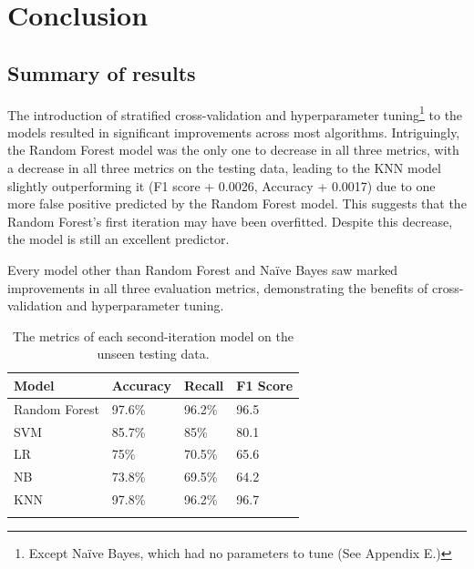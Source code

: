 \documentclass[12pt]{report}
\newcommand{\para}{\vspace{8pt}\noindent}
\begin{document}
\chapter{Conclusion}
\section{Summary of results} 

The introduction of stratified cross-validation and hyperparameter tuning\footnote{Except Na\"ive Bayes, which had no parameters to tune (See Appendix E.)} to the models
resulted in significant improvements across most algorithms. Intriguingly, the Random Forest model was the only one to decrease in all three metrics, with a decrease in 
all three metrics on the testing data, leading to the KNN model slightly outperforming it (F1 score + 0.0026, Accuracy + 0.0017)
due to one more false positive predicted by the Random Forest model. This suggests that the Random Forest's first iteration may have been overfitted. Despite 
this decrease, the model is still an excellent predictor.

\para Every model other than Random Forest and Na\"ive Bayes saw marked improvements in all three evaluation metrics, demonstrating the benefits of cross-validation 
and hyperparameter tuning.

\begin{longtable}{ | p{} | p{} | p{} | p{} | }
    \hline
    \cellcolor{blue!25} Model & \cellcolor{blue!25} Accuracy & \cellcolor{blue!25} Recall & \cellcolor{blue!25} F1 Score\\
    \hline
    Random Forest & 97.6\% & 96.2\% & 96.5\\
    \hline
    SVM & 85.7\% & 85\% & 80.1 \\
    \hline
    LR & 75\% & 70.5\% & 65.6\\
    \hline
    NB & 73.8\% & 69.5\% & 64.2\\
    \hline
    KNN & 97.8\% & 96.2\% & 96.7 \\
    \hline
    \caption{The metrics of each second-iteration model on the unseen testing data.}\label{tab:Iteration2Results}
\end{longtable}
\end{document}
